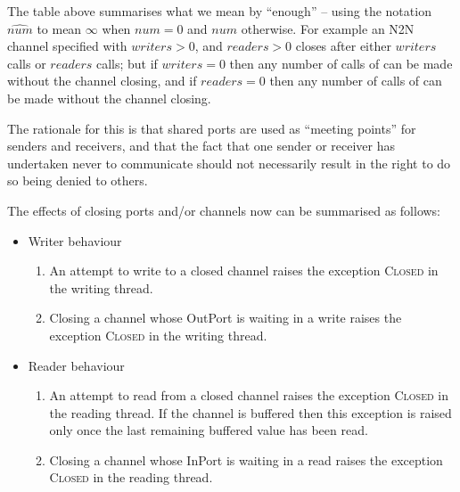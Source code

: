 \documentclass[12pt]{IOS-Book-Article-CPA-2017}
\begin{document}
The table above summarises what we mean by ``enough'' -- using the notation $\widehat{num}$
to mean $\infty$ when $num=0$ and $num$ otherwise. For example
an \textsc{N2N} channel specified with $writers>0$, and $readers>0$  closes
after either $writers$  calls or $readers$
 calls; but if $writers=0$ then any number of calls
of  can be made without the channel closing, and
if $readers=0$ then any number of calls of  can
be made without the channel closing.

The rationale for this is that shared ports are used as
``meeting points'' for senders and receivers, and that the fact
that one sender or receiver has undertaken never to communicate
should not necessarily result in the right to do so being denied to others.

The effects of closing ports and/or channels now can be summarised as follows:

\begin{itemize}
\item Writer behaviour
\begin{enumerate}
\item An attempt to write to a closed channel raises the exception
      \textsc{Closed} in the writing thread.
\item Closing a channel whose OutPort is waiting
      in a write raises the exception
      \textsc{Closed} in the writing thread.
\end{enumerate}    

\item Reader behaviour
\begin{enumerate}
\item An attempt to read from a closed channel raises the exception
      \textsc{Closed} in the reading thread. If the channel 
      is buffered then this exception is raised
      only once the last remaining buffered value has been read.
\item Closing a channel whose InPort is waiting
      in a read raises the exception
      \textsc{Closed} in the reading thread.
\end{enumerate}
\end{itemize}
\end{document}
